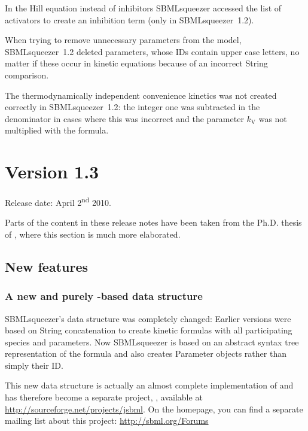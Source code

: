 \begin{dinglist}{54}
\item In the Hill equation instead of inhibitors SBMLsqueezer accessed the list of
activators to create an inhibition term (only in SBMLsqueezer~1.2).

\item When trying to remove unnecessary parameters from the model, SBMLsqueezer~1.2
deleted parameters, whose \acp{ID} contain upper case letters, no matter if
these occur in kinetic equations because of an incorrect String comparison.

\item The thermodynamically independent convenience kinetics was not created correctly
in SBMLsqueezer~1.2: the integer one was subtracted in the denominator in cases
where this was incorrect and the parameter $k_\mathrm{V}$ was not multiplied with the
formula.
\end{dinglist}

\section{Version 1.3}

Release date: April 2\textsuperscript{nd} 2010.

Parts of the content in these release notes have been taken from the Ph.D.
thesis of \citealp{Draeger2011a}, where this section is much more elaborated.

\subsection{New features}

\subsubsection{A new and purely \Java-based \SBML data structure}

SBMLsqueezer's data structure was completely changed: Earlier versions were
based on String concatenation to create kinetic formulas with all participating
species and parameters. Now SBMLsqueezer is based on an abstract syntax tree
representation of the formula and also creates Parameter objects rather than
simply their \ac{ID}.

This new data structure is actually an almost complete \Java implementation of
\SBML and has therefore become a separate project, \JSBML, available at
\url{http://sourceforge.net/projects/jsbml}. On the \SBML homepage, you can find
a separate mailing list about this project: \url{http://sbml.org/Forums}

